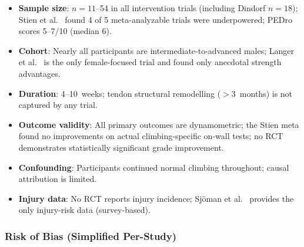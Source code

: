 \begin{itemize}[noitemsep, topsep=2pt]
  \item \textbf{Sample size}: $n=11$--54 in all intervention trials (including Dindorf $n=18$); Stien et al.\ \cite{SO23} found 4 of 5 meta-analyzable trials were underpowered; PEDro scores 5--7/10 (median 6).
  \item \textbf{Cohort}: Nearly all participants are intermediate-to-advanced males; Langer et al.\ \cite{LAS24} is the only female-focused trial and found only anecdotal strength advantages.
  \item \textbf{Duration}: 4--10~weeks; tendon structural remodelling ($>\!3$~months) is not captured by any trial.
  \item \textbf{Outcome validity}: All primary outcomes are dynamometric; the Stien meta found no improvements on actual climbing-specific on-wall tests; no RCT demonstrates statistically significant grade improvement.
  \item \textbf{Confounding}: Participants continued normal climbing throughout; causal attribution is limited.
  \item \textbf{Injury data}: No RCT reports injury incidence; Sjöman et al.\ \cite{O23} provides the only injury-risk data (survey-based).
\end{itemize}

\subsubsection*{Risk of Bias (Simplified Per-Study)}

